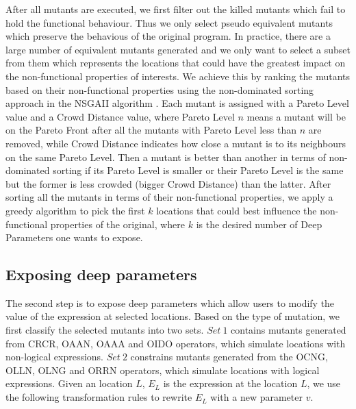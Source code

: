 After all mutants are executed, we first filter out the killed mutants which fail to hold the functional behaviour.  Thus we only select pseudo equivalent mutants which preserve the behavious of the original program. 
In practice, there are a large number of equivalent mutants \cite{5477100} generated and we only want to select a subset from them which represents the locations that could have the greatest impact on the non-functional properties of interests.  
We achieve this by ranking the mutants based on their non-functional properties using the non-dominated sorting approach in the NSGAII algorithm \cite{996017}. Each mutant is assigned with a Pareto Level value and a Crowd Distance value, where Pareto Level $n$ means a mutant will be on the Pareto Front after all the mutants with Pareto Level less than $n$ are removed, while Crowd Distance indicates how close a mutant is to its neighbours on the same Pareto Level. Then a mutant is better than another in terms of non-dominated sorting if its Pareto Level is smaller or their Pareto Level is the same but the former is less crowded (bigger Crowd Distance) than the latter. After sorting all the mutants in terms of their non-functional properties, we apply a greedy algorithm to pick the first $k$ locations that could best influence the non-functional properties of the original, where $k$ is the desired number of Deep Parameters one wants to expose.




\subsection{Exposing deep parameters}
\label{exposing}
The second step is to expose deep parameters which allow users to modify the value of the expression at selected locations. Based on the type of mutation, we first classify the selected mutants into two sets. $Set\ 1$ contains mutants generated from CRCR, OAAN, OAAA and OIDO operators, which simulate locations with non-logical expressions. $Set\ 2$ constrains mutants generated from the OCNG, OLLN, OLNG and ORRN operators, which simulate locations with logical expressions. 
Given an location $L$, $E_L$ is the expression at the location $L$, we use the following transformation rules to rewrite $E_L$ with a new parameter $v$.

